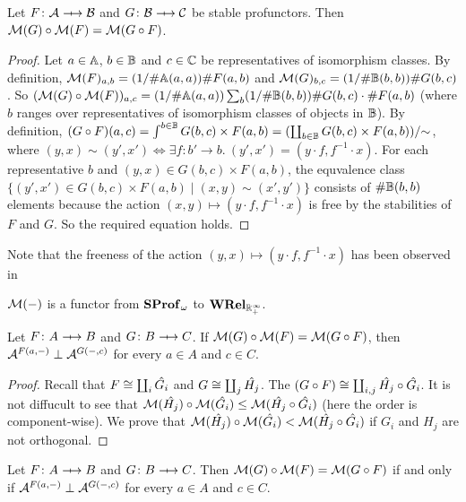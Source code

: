 \begin{theorem}
    Let \( F \colon \creed \profarrow \creedb \) and \( G \colon \creedb \profarrow \creedc \) be stable profunctors.
    Then \( \mathcal{M}({G}) \circ \mathcal{M}({F}) = \mathcal{M}({G \circ F}) \).
\end{theorem}
\begin{proof}
    Let \( a \in \mathbb{A} \), \( b \in \mathbb{B} \) and \( c \in \mathbb{C} \) be representatives of isomorphism classes.
    By definition, \( \mathcal{M}({F})_{a,b} = (1/\#\mathbb{A}(a,a)) \# F(a,b) \) and \( \mathcal{M}({G})_{b,c} = (1/\#\mathbb{B}(b,b)) \#G(b,c) \).
    So \( (\mathcal{M}({G}) \circ \mathcal{M}({F}))_{a,c} = (1/\#\mathbb{A}(a,a)) \sum_{b} (1/\#\mathbb{B}(b,b)) \# G(b,c) \cdot \# F(a,b) \) (where \( b \) ranges over representatives of isomorphism classes of objects in \( \mathbb{B} \)).
    By definition, \( (G \circ F)(a,c) = \int^{b \in \mathbb{B}} G(b,c) \times F(a,b) = (\coprod_{b \in \mathbb{B}} G(b,c) \times F(a,b)) / {\sim} \), where \( (y,x) \sim (y', x') \Longleftrightarrow \exists f \colon b' \to b.\ (y', x') = (y \cdot f, f^{-1} \cdot x) \).
    For each representative \( b \) and \( (y,x) \in G(b,c) \times F(a,b) \), the equvalence class \( \{ (y', x') \in G(b,c) \times F(a,b) \mid (x,y) \sim (x', y') \} \) consists of \( \# \mathbb{B}(b,b) \) elements because the action \( (x,y) \mapsto (y \cdot f, f^{-1} \cdot x) \) is free by the stabilities of \( F \) and \( G \).
    So the required equation holds.
\end{proof}
Note that the freeness of the action \( (y,x) \mapsto (y \cdot f, f^{-1} \cdot x) \) has been observed in \cite{Fiore2024}

\begin{corollary}
    \( \mathcal{M}({{-}}) \) is a functor from \( \mathbf{SProf}_\omega \) to \( \mathbf{WRel}_{\mathbb{R}_+^\infty} \).
\end{corollary}

\begin{theorem}
    Let \( F \colon A \profarrow B \) and \( G \colon B \profarrow C \).
    If \( \mathcal{M}({G}) \circ \mathcal{M}({F}) = \mathcal{M}({G \circ F}) \), then \( \mathcal{A}^{F(a, {-})} \mathrel{\bot} \mathcal{A}^{G({-}, c)} \) for every \( a \in A \) and \( c \in C \).
\end{theorem}
\begin{proof}
    Recall that \( F \cong \coprod_i \hat{G_i} \) and \( G \cong \coprod_j \hat{H_j} \).
    The \( (G \circ F) \cong \coprod_{i,j} \hat{H_j} \circ \hat{G_i} \).
    It is not diffucult to see that \( \mathcal{M}({\hat{H_j}}) \circ \mathcal{M}({\hat{G_i}}) \le \mathcal{M}({\hat{H_j} \circ \hat{G_i}}) \) (here the order is component-wise).
    We prove that \( \mathcal{M}({\hat{H_j}}) \circ \mathcal{M}({\hat{G_i}}) < \mathcal{M}({\hat{H_j} \circ \hat{G_i}}) \) if \( G_i \) and \( H_j \) are not orthogonal.

\end{proof}

\begin{theorem}
    Let \( F \colon A \profarrow B \) and \( G \colon B \profarrow C \).
    Then \( \mathcal{M}({G}) \circ \mathcal{M}({F}) = \mathcal{M}({G \circ F}) \) if and only if \( \mathcal{A}^{F(a, {-})} \mathrel{\bot} \mathcal{A}^{G({-}, c)} \) for every \( a \in A \) and \( c \in C \).
\end{theorem}





